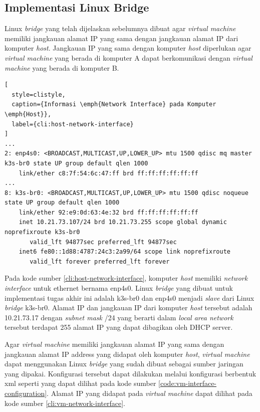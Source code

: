 \subsection{Implementasi Linux Bridge}
\label{subsec:implementasi-linux-bridge}

Linux \emph{bridge} yang telah dijelaskan sebelumnya dibuat
agar \emph{virtual machine} memiliki jangkauan alamat IP yang sama
dengan jangkauan alamat IP dari komputer \emph{host}. Jangkauan IP yang
sama dengan komputer \emph{host} diperlukan agar \emph{virtual machine}
yang berada di komputer A dapat berkomunikasi dengan \emph{virtual machine}
yang berada di komputer B.

\begin{lstlisting}[
  style=clistyle,
  caption={Informasi \emph{Network Interface} pada Komputer \emph{Host}},
  label={cli:host-network-interface}
]
...
2: enp4s0: <BROADCAST,MULTICAST,UP,LOWER_UP> mtu 1500 qdisc mq master k3s-br0 state UP group default qlen 1000
    link/ether c8:7f:54:6c:47:ff brd ff:ff:ff:ff:ff:ff
...
8: k3s-br0: <BROADCAST,MULTICAST,UP,LOWER_UP> mtu 1500 qdisc noqueue state UP group default qlen 1000
    link/ether 92:e9:0d:63:4e:32 brd ff:ff:ff:ff:ff:ff
    inet 10.21.73.107/24 brd 10.21.73.255 scope global dynamic noprefixroute k3s-br0
       valid_lft 94877sec preferred_lft 94877sec
    inet6 fe80::1d88:4787:24c3:2a99/64 scope link noprefixroute
       valid_lft forever preferred_lft forever
\end{lstlisting}

Pada kode sumber \ref{cli:host-network-interface}, komputer \emph{host} memiliki
\emph{network interface} untuk ethernet bernama enp4s0. Linux \emph{bridge} yang
dibuat untuk implementasi tugas akhir ini adalah k3s-br0 dan enp4s0 menjadi
\emph{slave} dari Linux \emph{bridge} k3s-br0. Alamat IP dan jangkauan IP dari
komputer \emph{host} tersebut adalah 10.21.73.17 dengan \emph{subnet mask} /24
yang berarti dalam \emph{local area network} tersebut terdapat 255 alamat
IP yang dapat dibagikan oleh DHCP server.

Agar \emph{virtual machine} memiliki jangkauan alamat IP yang sama dengan 
jangkauan alamat IP address yang didapat oleh komputer \emph{host}, \emph{virtual machine}
dapat menggunakan Linux \emph{bridge} yang sudah dibuat sebagai sumber jaringan
yang dipakai. Konfigurasi tersebut dapat dilakukan melalui konfigurasi berbentuk
xml seperti yang dapat dilihat pada kode sumber \ref{code:vm-interface-configuration}.
Alamat IP yang didapat pada \emph{virtual machine} dapat dilihat pada kode
sumber \ref{cli:vm-network-interface}.

